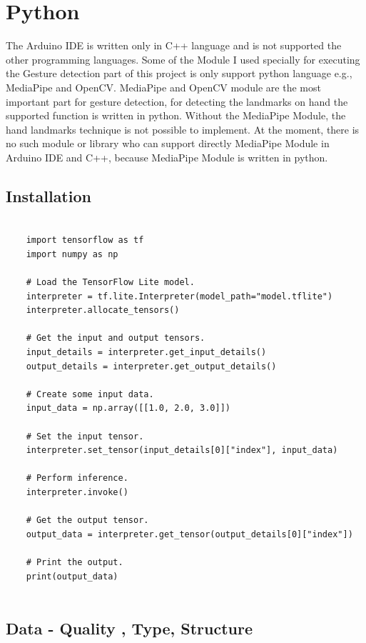 \section{Python}
The Arduino IDE is written only in C++ language and is not supported the other programming languages. Some of the Module I used specially for executing the Gesture detection part of this project is only support python language e.g., MediaPipe and OpenCV. MediaPipe and OpenCV module are the most important part for gesture detection, for detecting the landmarks on hand the supported function is written in python. Without the MediaPipe Module, the hand landmarks technique is not possible to implement. At the moment, there is no such module or library who can support directly MediaPipe Module in Arduino IDE and C++, because MediaPipe Module is written in python.
\subsection{Installation}
\label{Python}
\begin{lstlisting}
	
	import tensorflow as tf
	import numpy as np
	
	# Load the TensorFlow Lite model.
	interpreter = tf.lite.Interpreter(model_path="model.tflite")
	interpreter.allocate_tensors()
	
	# Get the input and output tensors.
	input_details = interpreter.get_input_details()
	output_details = interpreter.get_output_details()
	
	# Create some input data.
	input_data = np.array([[1.0, 2.0, 3.0]])
	
	# Set the input tensor.
	interpreter.set_tensor(input_details[0]["index"], input_data)
	
	# Perform inference.
	interpreter.invoke()
	
	# Get the output tensor.
	output_data = interpreter.get_tensor(output_details[0]["index"])
	
	# Print the output.
	print(output_data)
	
\end{lstlisting}

\subsection{Data - Quality , Type, Structure}




